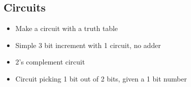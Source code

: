 \documentclass[12 pt]{article}
\begin{document}
		\subsection{Circuits}
		\begin{itemize}
			\item Make a circuit with a truth table
			\item Simple 3 bit increment with 1 circuit, no adder
			\item 2's complement circuit
			\item Circuit picking 1 bit out of 2 bits, given a 1 bit number
			\end{itemize}
\end{document}
